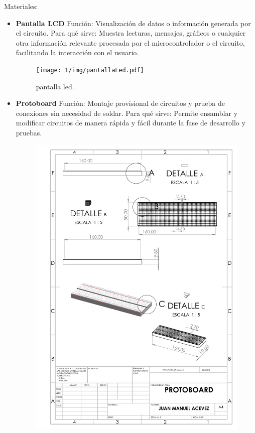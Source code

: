     Materiales:
    \begin{itemize}
    \item \textbf{Pantalla LCD}
    Función: Visualización de datos o información generada por el circuito.
    Para qué sirve: Muestra lecturas, mensajes, gráficos o cualquier otra información relevante procesada por el microcontrolador o el circuito, facilitando la interacción con el usuario.
    \begin{figure}[H]
        \centering
        \texttt{[image: 1/img/pantallaLed.pdf]}
        \caption{pantalla led.}
    \end{figure}
    \item \textbf{Protoboard}
    Función: Montaje provisional de circuitos y prueba de conexiones sin necesidad de soldar.
    Para qué sirve: Permite ensamblar y modificar circuitos de manera rápida y fácil durante la fase de desarrollo y pruebas.
    \begin{figure}[H]
        \centering
        \includegraphics[scale=0.30]{1/img/protoboard.pdf}

\end{figure}
\end{itemize}
